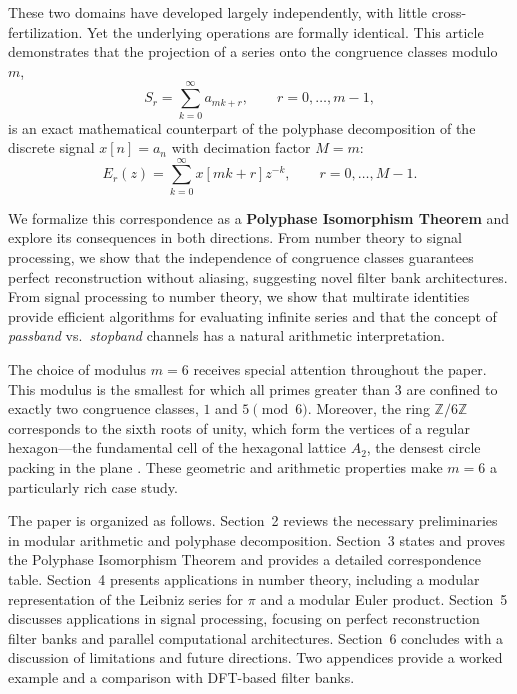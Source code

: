 \documentclass[12pt,a4paper]{article}
\theoremstyle{plain}
\theoremstyle{definition}
\theoremstyle{remark}
\begin{document}
These two domains have developed largely independently, with little cross-fertilization. Yet the underlying operations are formally identical. This article demonstrates that the projection of a series onto the congruence classes modulo \(m\),
\begin{equation}
S_r = \sum_{k=0}^{\infty} a_{mk + r}, \qquad r = 0, \dots, m-1,
\label{eq:modproj}
\end{equation}
is an exact mathematical counterpart of the polyphase decomposition of the discrete signal \(x[n] = a_n\) with decimation factor \(M = m\):
\begin{equation}
E_r(z) = \sum_{k=0}^{\infty} x[mk + r] z^{-k}, \qquad r = 0, \dots, M-1.
\label{eq:polyphase}
\end{equation}

We formalize this correspondence as a \textbf{Polyphase Isomorphism Theorem} and explore its consequences in both directions. From number theory to signal processing, we show that the independence of congruence classes guarantees perfect reconstruction without aliasing, suggesting novel filter bank architectures. From signal processing to number theory, we show that multirate identities provide efficient algorithms for evaluating infinite series and that the concept of \emph{passband} vs.\ \emph{stopband} channels has a natural arithmetic interpretation.

The choice of modulus \(m=6\) receives special attention throughout the paper. This modulus is the smallest for which all primes greater than 3 are confined to exactly two congruence classes, \(1\) and \(5 \pmod{6}\). Moreover, the ring \(\mathbb{Z}/6\mathbb{Z}\) corresponds to the sixth roots of unity, which form the vertices of a regular hexagon---the fundamental cell of the hexagonal lattice \(A_2\), the densest circle packing in the plane \cite{conway1999sphere}. These geometric and arithmetic properties make \(m=6\) a particularly rich case study.

The paper is organized as follows. Section~2 reviews the necessary preliminaries in modular arithmetic and polyphase decomposition. Section~3 states and proves the Polyphase Isomorphism Theorem and provides a detailed correspondence table. Section~4 presents applications in number theory, including a modular representation of the Leibniz series for \(\pi\) and a modular Euler product. Section~5 discusses applications in signal processing, focusing on perfect reconstruction filter banks and parallel computational architectures. Section~6 concludes with a discussion of limitations and future directions. Two appendices provide a worked example and a comparison with DFT-based filter banks.
\end{document}
